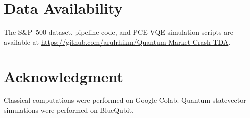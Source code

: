 \documentclass[conference,10pt]{IEEEtran}
\begin{document}
\section*{Data Availability}

The S\&P~500 dataset, pipeline code, and PCE-VQE simulation scripts
are available at \url{https://github.com/arulrhikm/Quantum-Market-Crash-TDA}.

\section*{Acknowledgment}

Classical computations were performed on Google Colab. Quantum
statevector simulations were performed on BlueQubit.



\end{document}
